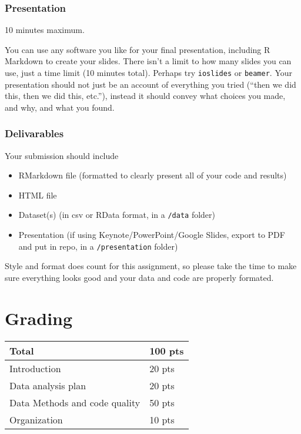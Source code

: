 \documentclass[
]{book}
\providecommand{\tightlist}{%
  \setlength{\itemsep}{0pt}\setlength{\parskip}{0pt}}
\begin{document}
\hypertarget{presentation}{%
\subsubsection{Presentation}\label{presentation}}

10 minutes maximum.

You can use any software you like for your final presentation, including R Markdown
to create your slides. There isn't a limit to how many slides you can use, just a
time limit (10 minutes total). Perhaps try \texttt{ioslides} or \texttt{beamer}. Your presentation
should not just be an account of everything you
tried (``then we did this, then we did this, etc.''), instead it should convey what
choices you made, and why, and what you found.

\hypertarget{delivarables}{%
\subsubsection{Delivarables}\label{delivarables}}

Your submission should include

\begin{itemize}
\tightlist
\item
  RMarkdown file (formatted to clearly present all of your code and results)
\item
  HTML file
\item
  Dataset(s) (in csv or RData format, in a \texttt{/data} folder)
\item
  Presentation (if using Keynote/PowerPoint/Google Slides, export to PDF and put in repo, in a \texttt{/presentation} folder)
\end{itemize}

Style and format does count for this assignment, so please take the time to make
sure everything looks good and your data and code are properly formated.

\hypertarget{grading}{%
\section{Grading}\label{grading}}

\begin{longtable}[]{@{}ll@{}}
\toprule()
Total & 100 pts \\
\midrule()
\endhead
Introduction & 20 pts \\
Data analysis plan & 20 pts \\
Data Methods and code quality & 50 pts \\
Organization & 10 pts \\
\bottomrule()
\end{longtable}
\end{document}
